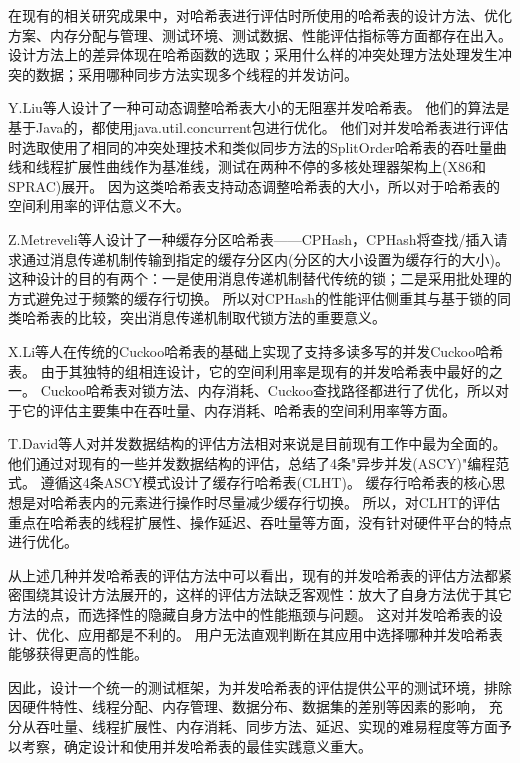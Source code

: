 在现有的相关研究成果中\cite{clht,cuckoo,hopscotch,metreveli2012cphash,nonblocking}，对哈希表进行评估时所使用的哈希表的设计方法、优化方案、内存分配与管理、测试环境、测试数据、性能评估指标等方面都存在出入。
设计方法上的差异体现在哈希函数的选取；采用什么样的冲突处理方法处理发生冲突的数据；采用哪种同步方法实现多个线程的并发访问。

Y.Liu等人设计了一种可动态调整哈希表大小的无阻塞并发哈希表\cite{nonblocking}。
他们的算法是基于Java的，都使用java.util.concurrent包进行优化。
他们对并发哈希表进行评估时选取使用了相同的冲突处理技术和类似同步方法的SplitOrder哈希表\cite{shalev2006split}的吞吐量曲线和线程扩展性曲线作为基准线，测试在两种不停的多核处理器架构上(X86和SPRAC)展开。
因为这类哈希表支持动态调整哈希表的大小，所以对于哈希表的空间利用率的评估意义不大。

Z.Metreveli等人设计了一种缓存分区哈希表——CPHash\cite{metreveli2012cphash}，CPHash将查找/插入请求通过消息传递机制传输到指定的缓存分区内(分区的大小设置为缓存行的大小)。这种设计的目的有两个：一是使用消息传递机制替代传统的锁；二是采用批处理的方式避免过于频繁的缓存行切换。
所以对CPHash的性能评估侧重其与基于锁的同类哈希表的比较，突出消息传递机制取代锁方法的重要意义。

X.Li等人在传统的Cuckoo哈希表的基础上实现了支持多读多写的并发Cuckoo哈希表\cite{cuckoo}。
由于其独特的组相连设计，它的空间利用率是现有的并发哈希表中最好的之一。
Cuckoo哈希表对锁方法、内存消耗、Cuckoo查找路径都进行了优化，所以对于它的评估主要集中在吞吐量、内存消耗、哈希表的空间利用率等方面。

T.David等人对并发数据结构的评估方法相对来说是目前现有工作中最为全面的\cite{clht}。
他们通过对现有的一些并发数据结构的评估，总结了4条"异步并发(ASCY)"编程范式。
遵循这4条ASCY模式设计了缓存行哈希表(CLHT)。
缓存行哈希表的核心思想是对哈希表内的元素进行操作时尽量减少缓存行切换。
所以，对CLHT的评估重点在哈希表的线程扩展性、操作延迟、吞吐量等方面，没有针对硬件平台的特点进行优化。

从上述几种并发哈希表的评估方法中可以看出，现有的并发哈希表的评估方法都紧密围绕其设计方法展开的，这样的评估方法缺乏客观性：放大了自身方法优于其它方法的点，而选择性的隐藏自身方法中的性能瓶颈与问题。
这对并发哈希表的设计、优化、应用都是不利的。
用户无法直观判断在其应用中选择哪种并发哈希表能够获得更高的性能。

因此，设计一个统一的测试框架，为并发哈希表的评估提供公平的测试环境，排除因硬件特性、线程分配、内存管理、数据分布、数据集的差别等因素的影响，
充分从吞吐量、线程扩展性、内存消耗、同步方法、延迟、实现的难易程度等方面予以考察，确定设计和使用并发哈希表的最佳实践意义重大。

